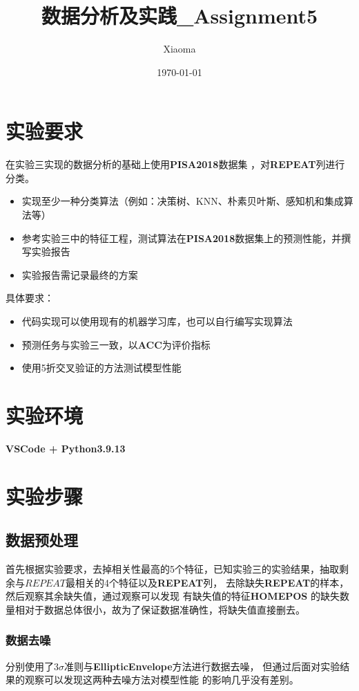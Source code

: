\documentclass[12pt, a4paper, oneside]{ctexart}
\title{数据分析及实践\_Assignment5}
\author{Xiaoma}
\date{\today}
\begin{document}
\maketitle
\section{实验要求}
在实验三实现的数据分析的基础上使用\textbf{PISA2018}数据集
，对\textbf{REPEAT}列进行分类。
\begin{itemize}
    \item 实现至少一种分类算法（例如：决策树、KNN、朴素贝叶斯、感知机和集成算法等）
    \item 参考实验三中的特征工程，测试算法在\textbf{PISA2018}数据集上的预测性能，并撰写实验报告
    \item 实验报告需记录最终的方案
\end{itemize}

具体要求：
\begin{itemize}
    \item 代码实现可以使用现有的机器学习库，也可以自行编写实现算法
    \item 预测任务与实验三一致，以\textbf{ACC}为评价指标
    \item 使用5折交叉验证的方法测试模型性能
\end{itemize}
\newpage

\section{实验环境}
\textbf{VSCode + Python3.9.13}
\section{实验步骤}
\subsection{数据预处理}
首先根据实验要求，去掉相关性最高的5个特征，已知实验三的实验结果，抽取剩余与$REPEAT$最相关的4个特征以及\textbf{REPEAT}列，
去除缺失\textbf{REPEAT}的样本，然后观察其余缺失值，通过观察可以发现
有缺失值的特征\textbf{HOMEPOS}
的缺失数量相对于数据总体很小，故为了保证数据准确性，将缺失值直接删去。

\subsubsection{数据去噪}
分别使用了$3\sigma$准则与\textbf{EllipticEnvelope}方法进行数据去噪，
但通过后面对实验结果的观察可以发现这两种去噪方法对模型性能
的影响几乎没有差别。
\end{document}
